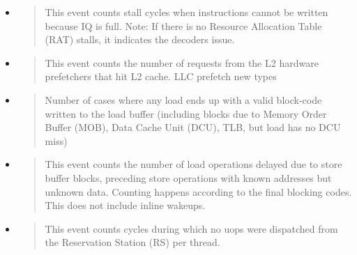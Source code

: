 \begin{itemize}
\item {}
\begin{quotation}
This event counts stall cycles when instructions cannot be written because IQ is
full. Note: If there is no Resource Allocation Table (RAT) stalls, it indicates
the decoders issue.
\end{quotation}

\item {}
\begin{quotation}
This event counts the number of requests from the L2 hardware prefetchers that
hit L2 cache. LLC prefetch new types
\end{quotation}

\item {}
\begin{quotation}
Number of cases where any load ends up with a valid block-code written to the
load buffer (including blocks due to Memory Order Buffer (MOB), Data Cache Unit
(DCU), TLB, but load has no DCU miss)
\end{quotation}

\item {}
\begin{quotation}
This event counts the number of load operations delayed due to store buffer
blocks, preceding store operations with known addresses but unknown data.
Counting happens according to the final blocking codes. This does not include
inline wakeups.
\end{quotation}

\item {}
\begin{quotation}
This event counts cycles during which no uops were dispatched from the
Reservation Station (RS) per thread.
\end{quotation}

\end{itemize}

